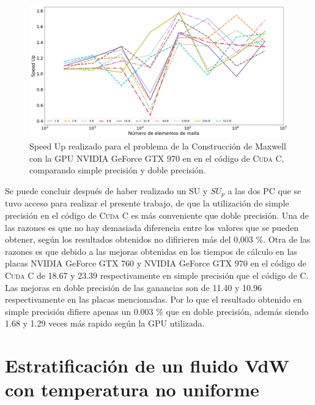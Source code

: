 \begin{figure}[htbp]
	\centering
	\includegraphics[width=\textwidth]{figs/cap4/c_970_MxC_cuda_10}
	\caption{Speed Up realizado para el problema de la Construcción de Maxwell con la GPU NVIDIA GeForce GTX 970 en en el código de \textsc{Cuda C}, comparando simple precisión y doble precisión.} 
	\label{fig:c_970_MxC_cuda_10}	
\end{figure}




Se puede concluir después de haber realizado un SU y $SU_p$ a las dos PC que se tuvo acceso para realizar el presente trabajo, de que la utilización de simple precisión en el código de \textsc{Cuda C} es más conveniente que doble precisión. Una de las razones es que no hay demasiada diferencia entre los valores que se pueden obtener, según los resultados obtenidos no difirieren más del 0,003 \%. Otra de las razones es que debido a las mejoras obtenidas en los tiempos de cálculo en las placas NVIDIA GeForce GTX 760 y NVIDIA GeForce GTX 970 en el código de \textsc{Cuda C} de 18.67 y 23.39 respectivamente en simple precisión que el código de \textsc{C}. Las mejoras en doble precisión de las ganancias son de 11.40 y 10.96 respectivamente en las placas mencionadas. Por lo que el resultado obtenido en simple precisión difiere apenas un 0.003 \% que en doble precisión, además siendo 1.68 y 1.29 veces más rapido según la GPU utilizada.

\newpage

\section{Estratificación de un fluido VdW con temperatura no uniforme}

